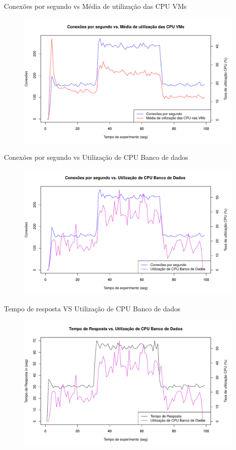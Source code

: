 \begin{frame}{Conexões por segundo vs Média de utilização das CPU VMs}
	\begin{figure}[htb]
		\centering
		\includegraphics[scale=0.5]{../monograph/images/cps-vmcpu60.pdf}
		\label{fig:cps-vmcpu60}
	\end{figure}
\end{frame}

\begin{frame}{Conexões por segundo vs Utilização de CPU Banco de dados}
	\begin{figure}[htb]
		\centering
		\includegraphics[scale=0.5]{../monograph/images/cps-dbcpu60.pdf}
		\label{fig:cps-dbcpu60}
	\end{figure}
\end{frame}

\begin{frame}{Tempo de resposta VS Utilização de CPU Banco de dados}
	\begin{figure}[htb]
		\centering
		\includegraphics[scale=0.5]{../monograph/images/resp-dbcpu60.pdf}
		\label{fig:resp-dbcpu60}
	\end{figure}
\end{frame}



